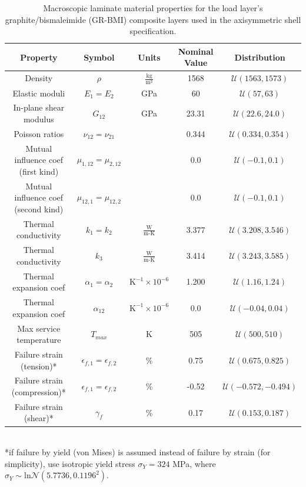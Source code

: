 \documentclass{article}
\begin{document}
\begin{table}
\caption[Gr-BMI material properties]{Macroscopic laminate material properties for the load layer's graphite/bismaleimide (GR-BMI) composite layers used in the axisymmetric shell specification.}
\label{tab:matPropGR-BMI}
\begin{center}
\begin{tabular}[]{ c | c | c | c | c }
\textbf{Property} & \textbf{Symbol} & \textbf{Units} & \textbf{Nominal Value} & \textbf{Distribution} \\ \hline
Density & $\rho$ & $\frac{\textrm{kg}}{\textrm{m}^3}$ & 1568 & $\mathcal{U}(1563,1573)$ \\ \hline
Elastic moduli & $E_{1} = E_{2}$ & GPa & 60 & $\mathcal{U}(57,63)$ \\ \hline
In-plane shear modulus & $G_{12}$ & GPa & 23.31 & $\mathcal{U}(22.6,24.0)$ \\ \hline
Poisson ratios & $\nu_{12} = \nu_{21}$ & & 0.344 & $\mathcal{U}(0.334,0.354)$\\ \hline
Mutual influence coef (first kind) & $\mu_{1,12} = \mu_{2,12}$ & & 0.0 & $\mathcal{U}(-0.1,0.1)$ \\ \hline
Mutual influence coef (second kind) & $\mu_{12,1} = \mu_{12,2}$ & & 0.0 & $\mathcal{U}(-0.1,0.1)$ \\ \hline
Thermal conductivity & $k_{1} = k_{2}$ & $\frac{\textrm{W}}{\textrm{m-K}}$ & 3.377 & $\mathcal{U}(3.208,3.546)$ \\ \hline
Thermal conductivity & $k_{3}$ & $\frac{\textrm{W}}{\textrm{m-K}}$ & 3.414 & $\mathcal{U}(3.243,3.585)$ \\ \hline
Thermal expansion coef & $\alpha_{1} = \alpha_{2}$ & $\textrm{K}^{-1} \times 10^{-6}$ & 1.200 & $\mathcal{U}(1.16,1.24)$ \\ \hline
Thermal expansion coef & $\alpha_{12}$ & $\textrm{K}^{-1} \times 10^{-6}$ & 0.0 & $\mathcal{U}(-0.04,0.04)$ \\ \hline \hline
Max service temperature & $T_{max}$ & K & 505 & $\mathcal{U}(500,510)$ \\ \hline
Failure strain (tension)* & $\epsilon_{f,1} = \epsilon_{f,2}$ & \% & 0.75 & $\mathcal{U}(0.675,0.825)$ \\ \hline
Failure strain (compression)* & $\epsilon_{f,1} = \epsilon_{f,2}$ & \% & -0.52 & $\mathcal{U}(-0.572,-0.494)$ \\ \hline
Failure strain (shear)* & $\gamma_{f}$ & \% & 0.17 & $\mathcal{U}(0.153,0.187)$ \\ \hline
\end{tabular} \\
*if failure by yield (von Mises) is assumed instead of failure by strain (for simplicity), use isotropic yield stress $\sigma_Y = 324$ MPa, where $\sigma_Y \sim \textrm{ln}\mathcal{N}(5.7736,0.1196^2)$.
\end{center}
\end{table}
\end{document}
